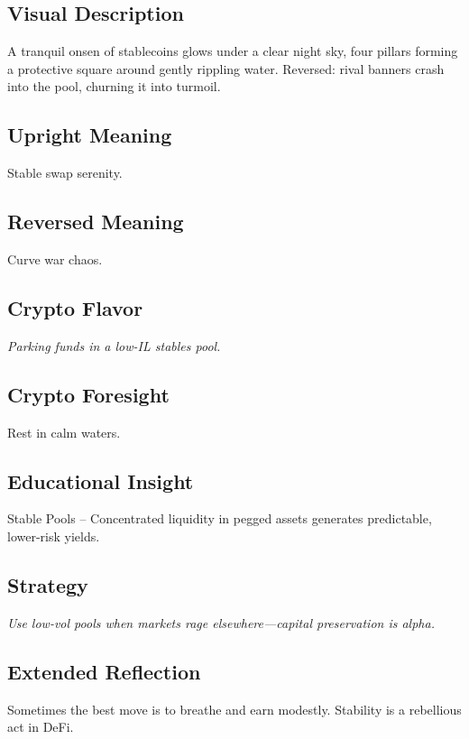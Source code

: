 \documentclass[11pt,oneside]{book}
\begin{document}
\begin{minipage}[t]{0.55\textwidth}
  \vspace{0pt}

  \subsection*{Visual Description}
  A tranquil onsen of stablecoins glows under a clear night sky, four pillars forming a protective square around gently rippling water. Reversed: rival banners crash into the pool, churning it into turmoil.

  \subsection*{Upright Meaning}
  Stable swap serenity.

  \subsection*{Reversed Meaning}
  Curve war chaos.

  \subsection*{Crypto Flavor}
  \textit{Parking funds in a low-IL stables pool.}

  \subsection*{Crypto Foresight}
  Rest in calm waters.

  \subsection*{Educational Insight}
  Stable Pools – Concentrated liquidity in pegged assets generates predictable, lower-risk yields.

  \subsection*{Strategy}
  \textit{Use low-vol pools when markets rage elsewhere—capital preservation is alpha.}

  \subsection*{Extended Reflection}
  Sometimes the best move is to breathe and earn modestly. Stability is a rebellious act in DeFi.


\end{minipage}
\end{document}
